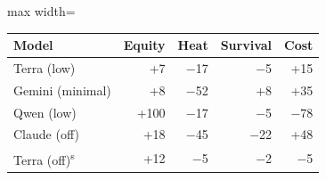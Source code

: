 \begin{adjustbox}{max width=\linewidth}
\begin{tabular}{@{}lrrrr@{}}
\toprule
Model & Equity & Heat & Survival & Cost \\
\midrule
Terra (low) & +7 & $-$17 & $-$5 & +15 \\
Gemini (minimal) & +8 & $-$52 & +8 & +35 \\
Qwen (low) & +100 & $-$17 & $-$5 & $-$78 \\
Claude (off) & +18 & $-$45 & $-$22 & +48 \\
Terra (off)\textsuperscript{s} & +12 & $-$5 & $-$2 & $-$5 \\
\bottomrule
\end{tabular}
\end{adjustbox}

\par{}
